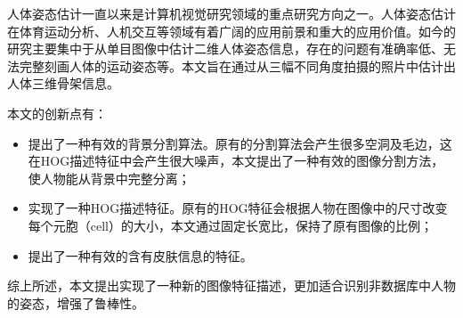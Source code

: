 
 

\makeatletter
\ifthu@bachelor\relax\else
  \ifthu@doctor
  \else
    \ifthu@master
    \fi
  \fi
\fi
\makeatother





\begin{cabstract}

人体姿态估计一直以来是计算机视觉研究领域的重点研究方向之一。人体姿态估计在体育运动分析、人机交互等领域有着广阔的应用前景和重大的应用价值。如今的研究主要集中于从单目图像中估计二维人体姿态信息，存在的问题有准确率低、无法完整刻画人体的运动姿态等。本文旨在通过从三幅不同角度拍摄的照片中估计出人体三维骨架信息。

本文的创新点有：
  \begin{itemize}
    \item 提出了一种有效的背景分割算法。原有的分割算法会产生很多空洞及毛边，这在HOG描述特征中会产生很大噪声，本文提出了一种有效的图像分割方法，使人物能从背景中完整分离；
    \item 实现了一种HOG描述特征。原有的HOG特征会根据人物在图像中的尺寸改变每个元胞（cell）的大小，本文通过固定长宽比，保持了原有图像的比例；
    \item 提出了一种有效的含有皮肤信息的特征。
  \end{itemize}

综上所述，本文提出实现了一种新的图像特征描述，更加适合识别非数据库中人物的姿态，增强了鲁棒性。

\end{cabstract}


\begin{eabstract}

\end{eabstract}

